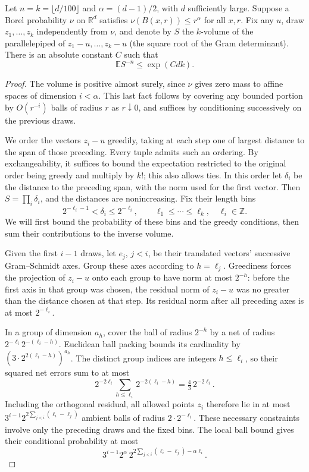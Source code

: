 \begin{lemma}\label{lc:cell-inverse}
Let \(n=k=\lfloor d/100\rfloor\) and \(\alpha=(d-1)/2\), with \(d\) sufficiently large. Suppose a Borel probability \(\nu\) on \(\mathbb R^d\) satisfies \(\nu(B(x,r))\le r^\alpha\) for all \(x,r\). Fix any \(u\), draw \(z_1,\ldots,z_k\) independently from \(\nu\), and denote by \(S\) the \(k\)-volume of the parallelepiped of \(z_1-u,\ldots,z_k-u\) (the square root of the Gram determinant). There is an absolute constant \(C\) such that
\begin{equation}\label{lc:cell-eq4}
\mathbb E S^{-n}\le \exp(Cdk).
\end{equation}
\end{lemma}
\begin{proof}
The volume is positive almost surely, since \(\nu\) gives zero mass to affine spaces of dimension \(i<\alpha\). This last fact follows by covering any bounded portion by \(O(r^{-i})\) balls of radius \(r\) as \(r\downarrow 0\), and suffices by conditioning successively on the previous draws.

We order the vectors \(z_i-u\) greedily, taking at each step one of
largest distance to the span of those preceding. Every tuple admits
such an ordering. By exchangeability, it suffices to bound the
expectation restricted to the original order being greedy and multiply
by \(k!\); this also allows ties. In this order let \(\delta_i\) be
the distance to the preceding span, with the norm used for the first
vector. Then \(S=\prod_i\delta_i\), and the distances are nonincreasing.
Fix their length bins
\[
 2^{-\ell_i-1}<\delta_i\le 2^{-\ell_i},\qquad
 \ell_1\le\cdots\le\ell_k,\quad \ell_i\in\mathbb Z.
\]
We will first bound the probability of these bins and the greedy
conditions, then sum their contributions to the inverse volume.

Given the first \(i-1\) draws, let \(e_j\), \(j<i\), be their
translated vectors' successive Gram--Schmidt axes. Group these axes
according to \(h=\ell_j\). Greediness forces the projection of
\(z_i-u\) onto each group to have norm at most \(2^{-h}\): before
the first axis in that group was chosen, the residual norm of
\(z_i-u\) was no greater than the distance chosen at that step.
Its residual norm after all preceding axes is at most \(2^{-\ell_i}\).

In a group of dimension \(a_h\), cover the ball of radius \(2^{-h}\)
by a net of radius \(2^{-\ell_i}2^{-(\ell_i-h)}\). Euclidean ball
packing bounds its cardinality by
\((3\cdot 2^{2(\ell_i-h)})^{a_h}\). The distinct group indices are
integers \(h\le\ell_i\), so their squared net errors sum to at most
\[
 2^{-2\ell_i}\sum_{h\le\ell_i}2^{-2(\ell_i-h)}
 =\tfrac43\,2^{-2\ell_i}.
\]
Including the orthogonal residual, all allowed points \(z_i\) therefore
lie in at most
\(3^{i-1}2^{2\sum_{j<i}(\ell_i-\ell_j)}\) ambient balls of radius
\(2\cdot2^{-\ell_i}\). These necessary constraints involve only the
preceding draws and the fixed bins. The local ball bound gives their
conditional probability at most
\[
 3^{i-1}2^\alpha\, 2^{2\sum_{j<i}(\ell_i-\ell_j)-\alpha\ell_i}.
\]


\end{proof}
